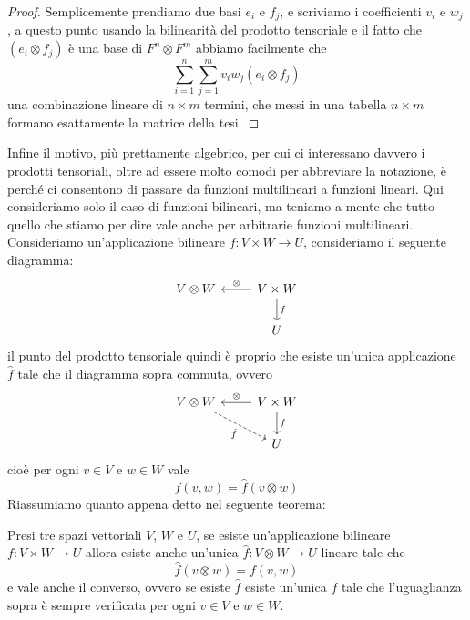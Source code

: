 \documentclass[11pt]{scrartcl}
\begin{document}
   	 \begin{proof}
   	 	Semplicemente prendiamo due basi $e_i$ e $f_j$, e scriviamo i coefficienti $v_i$ e $w_j$, a questo punto usando la bilinearità del prodotto tensoriale e il fatto che $(e_i\otimes f_j)$ è una base di $F^n\otimes F^m$ abbiamo facilmente che 
   	 	$$\sum_{i=1}^{n}\sum_{j=1}^m v_iw_j (e_i\otimes f_j)$$
   	 	una combinazione lineare di $n\times m$ termini, che messi in una tabella $n\times m$ formano esattamente la matrice della tesi.
   	 \end{proof}
   	 Infine il motivo, più prettamente algebrico, per cui ci interessano davvero i prodotti tensoriali, oltre ad essere molto comodi per abbreviare la notazione, è perché ci consentono di passare da funzioni multilineari a funzioni lineari. Qui consideriamo solo il caso di funzioni bilineari, ma teniamo a mente che tutto quello che stiamo per dire vale anche per arbitrarie funzioni multilineari. Consideriamo un'applicazione bilineare $f:V\times W \to U$, consideriamo il seguente diagramma:
   	 $$
   	 \begin{tikzcd}
   	 	V\otimes W 	&  V\times W \arrow[l,"\otimes",swap]\arrow[d,"f"]\\
   	 				& U 
   	 \end{tikzcd}
   	 $$
   	 il punto del prodotto tensoriale quindi è proprio che esiste un'unica applicazione $\hat{f}$ tale che il diagramma sopra commuta, ovvero
   	 $$
   	 \begin{tikzcd}
   	 	V\otimes W \arrow[dr,"\hat{f}",swap,dashed]	&  V\times W \arrow[l,"\otimes",swap]\arrow[d,"f"]\\
   	 	& U 
   	 \end{tikzcd}
   	 $$
   	 cioè per ogni $v\in V$ e $w\in W$ vale
   	 $$f(v,w)=\hat{f}(v\otimes w)$$
   	 Riassumiamo quanto appena detto nel seguente teorema:
   	 \begin{theorem}
   	 	Presi tre spazi vettoriali $V$, $W$ e $U$, se esiste un'applicazione bilineare $f:V\times W\to U$ allora esiste anche un'unica $\hat{f}:V\otimes W\to U$ lineare tale che 
   	 	$$\hat{f}(v\otimes w)=f(v,w)$$
   	 	e vale anche il converso, ovvero se esiste $\hat{f}$ esiste un'unica $f$ tale che l'uguaglianza sopra è sempre verificata per ogni $v\in V$ e $w\in W$.
   	 \end{theorem}
\end{document}
